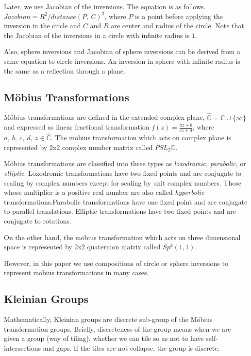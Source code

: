 Later, we use Jacobian of the inversions. The equation is as follows.
$Jacobian = R^2 / distance(P,~C)^2$, where $P$ is a point before
applying the inversion in the circle and $C$ and $R$ are center and
radius of the circle.
Note that the Jacobian of the inversions in a circle with
infinite radius is $1$.

Also, sphere inversions and Jacobian of sphere inversions can be
derived from a same equation to circle inversions.
An inversion in sphere with infinite radius is the same as a reflection
through a plane.

\subsection{M\"obius Transformations}

M\"obius transformations are defined in the extended complex plane,
$\hat{\mathbb{C}} = \mathbb{C} \cup \{\infty\}$ and expressed as linear
fractional transformation
$f(z)=\frac{az + b}{cz + d}$, where $a,~b,~c,~d,~z \in \hat{\mathbb{C}}$.
The m\"obius transformation which acts on complex plane is represented
by 2x2 complex number matrix called $PSL_2\mathbb{C}$.

M\"obius transformations are classified into three types as \textit{loxodromic},
\textit{parabolic}, or \textit{elliptic}.
Loxodromic transformations have two fixed points and are conjugate to
scaling by complex numbers except for scaling by unit complex numbers.
Those whose multiplier is a positive real number
are also called \textit{hyperbolic} transformations.Parabolic transformations
have one fixed point and are conjugate to parallel translations.
Elliptic transformations have two fixed points and are conjugate to rotations.

On the other hand, the m\"obius transformation which acts on three
dimensional space is represented
by 2x2 quaternion matrix called $Sp^k(1, 1)$.

However, in this paper we use compositions of circle or sphere
inversions to represent m\"obius transformations in many cases.

\subsection{Kleinian Groups}

Mathematically, Kleinian groups are discrete sub-group of the M\"obius transformation
groups. 
Briefly, discreteness of the group means when we are given a group (way of tiling),
whether we can tile so as not to have self-intersections and gaps.
If the tiles are not collapse, the group is discrete.

